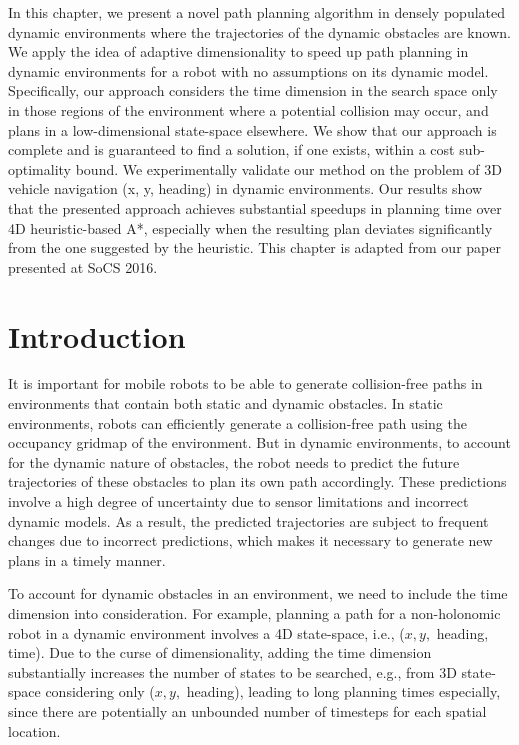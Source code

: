 In this chapter, we present a novel path planning algorithm in densely populated dynamic environments where the trajectories of the dynamic obstacles are known. We apply the idea of adaptive dimensionality to speed up path planning in dynamic environments for a robot with no assumptions on its dynamic model. Specifically, our approach considers the time dimension in the search space only in those regions of the environment where a potential collision may occur, and plans in a low-dimensional state-space elsewhere. We show that our approach is complete and is guaranteed to find a solution, if one exists, within a cost sub-optimality bound. We experimentally validate our method on the problem of 3D vehicle navigation (x, y, heading) in dynamic environments. Our results show that the presented approach achieves substantial speedups in planning time over 4D heuristic-based A*, especially when the resulting plan deviates significantly from the one suggested by the heuristic. This chapter is adapted from our paper \cite{vemula2016path} presented at SoCS 2016.

\section{Introduction}
\label{sec:ppad-introduction}

It is important for mobile robots to be able to generate collision-free paths in environments that contain both static and dynamic obstacles.
In static environments, robots can efficiently generate a collision-free path using the occupancy gridmap of the environment. But in dynamic environments, to account for the dynamic nature of obstacles, the robot needs to predict the future trajectories of these obstacles to plan its own path accordingly. These predictions involve a high degree of uncertainty due to sensor limitations and incorrect dynamic models. As a result, the predicted trajectories are subject to frequent changes due to incorrect predictions, which makes it necessary to generate new plans in a timely manner.

To account for dynamic obstacles in an environment, we need to include the time dimension into consideration. 
For example, planning a path for a non-holonomic robot in a dynamic environment involves a 4D state-space, i.e., ($x, y,$ heading, time). 
Due to the curse of dimensionality, adding the time dimension substantially increases the number of states to be searched, e.g., from 3D state-space considering only ($x, y,$ heading), leading to long planning times especially, since there are potentially an unbounded number of timesteps for each spatial location.  


